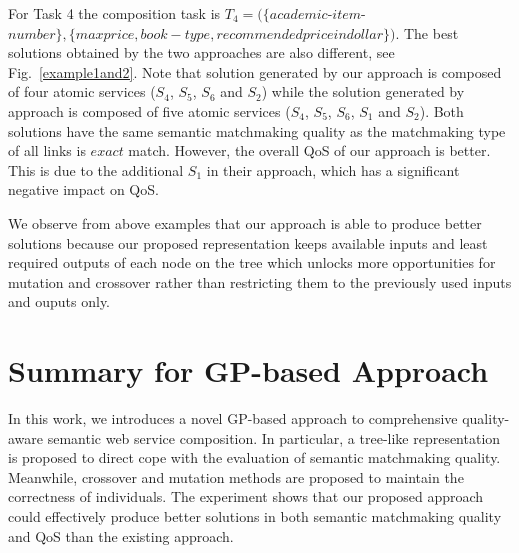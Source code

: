 For Task 4 the composition task is $T_4=(\{academic$-$item$-$number\},\{ maxprice, book-type,recommendedpriceindollar\})$. The best solutions obtained by the two approaches are also different, see Fig.~\ref{example1and2}. Note that solution generated by our approach is composed of four atomic services ($S_4$, $S_5$, $S_6$ and $S_2$) while the solution generated by approach \cite{ma2015hybrid} is composed of  five atomic services ($S_4$, $S_5$, $S_6$, $S_1$ and $S_2$). Both solutions have the same semantic matchmaking quality as the matchmaking type of all links is $exact$ match. However, the overall QoS of our approach is better. This is due to the additional $S_1$ in their approach, which has a significant negative impact on QoS.

We observe from above examples that our approach is able to produce better solutions because our proposed representation keeps available inputs and least required outputs of each node on the tree which unlocks more opportunities for 
mutation and crossover rather than restricting them to the previously used inputs and ouputs only.



\section{Summary for GP-based Approach}\label{summary2}

In this work, we introduces a novel GP-based approach to comprehensive quality-aware semantic web service composition. In particular, a tree-like representation is proposed to direct cope with the evaluation of semantic matchmaking quality. Meanwhile, crossover and mutation methods are proposed to maintain the correctness of individuals. The experiment  shows that our proposed approach could effectively produce better solutions in both semantic matchmaking quality and QoS than the existing approach.

